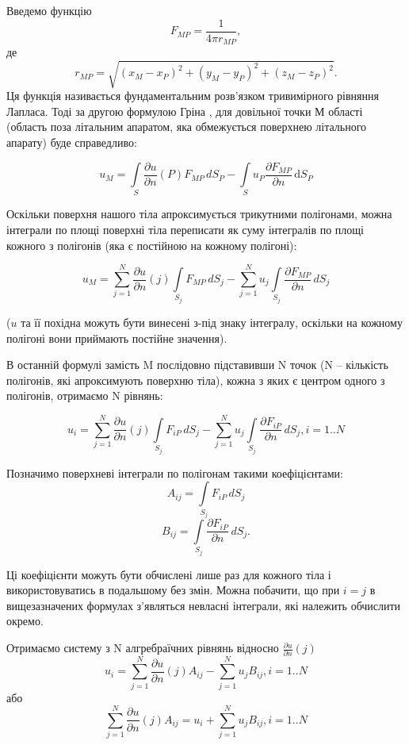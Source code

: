 \documentclass[a4paper,12pt]{article}
\begin{document}
Введемо функцію \[F_{MP} = \frac{1}{4\pi r_{MP}},\] де \[r_{MP} = \sqrt{(x_M - x_P)^2 + (y_M - y_P)^2 + (z_M - z_P)^2}.\]
Ця функція називається фундаментальним розв’язком тривимірного рівняння Лапласа. Тоді за другою формулою Гріна \cite{ilina}, для довільної точки М області (область поза літальним апаратом, яка обмежується поверхнею літального апарату) буде справедливо:

\[
u_M = \int\limits_S \frac{\partial u}{\partial n}(P) F_{MP} \, d S_P - \int\limits_S u_P \frac{\partial F_{MP}}{\partial n} \, \mathrm{d}S_P
\]

Оскільки поверхня нашого тіла апроксимується трикутними полігонами, можна інтеграли по площі поверхні тіла переписати як суму інтегралів по площі кожного з полігонів (яка є постійною на кожному полігоні):

\begin{equation} \label{eq:triangulated_equation}
u_M = \sum_{j=1}^{N} \frac{\partial u}{\partial n}(j) \int\limits_{S_j} F_{MP} \, dS_j - \sum_{j=1}^{N} u_j \int\limits_{S_j} \frac{\partial F_{MP}}{\partial n} \, dS_j
\end{equation}

($u$ та її похідна можуть бути винесені з-під знаку інтегралу, оскільки на кожному полігоні вони приймають постійне значення).

В останній формулі замість M послідовно підставивши N точок (N -- кількість полігонів, які апроксимують поверхню тіла), кожна з яких є центром одного з полігонів, отримаємо N рівнянь:

\[
u_i = \sum_{j=1}^{N} \frac{\partial u}{\partial n}(j) \int\limits_{S_j} F_{iP} \, dS_j - \sum_{j=1}^{N} u_j \int\limits_{S_j} \frac{\partial F_{iP}}{\partial n} \, dS_j, i = 1..N
\]

Позначимо поверхневі інтеграли по полігонам такими коефіцієнтами:
\[A_{ij} = \int\limits_{S_j} F_{iP} \, dS_j\]
\[B_{ij} = \int\limits_{S_j} \frac{\partial F_{iP}}{\partial n} \, dS_j.\]

Ці коефіцієнти можуть бути обчислені лише раз для кожного тіла і використовуватись в подальшому без змін. Можна побачити, що при $i = j$ в вищезазначених формулах з’являться невласні інтеграли, які належить обчислити окремо.

Отримаємо систему з N алгребраїчних рівнянь відносно $\frac{\partial u}{\partial n}(j)$
\[
u_i = \sum_{j=1}^{N} \frac{\partial u}{\partial n}(j) A_{ij} - \sum_{j=1}^{N} u_j B_{ij}, i = 1..N
\]
або
\[
\sum_{j=1}^{N} \frac{\partial u}{\partial n}(j) A_{ij} = u_i + \sum_{j=1}^{N} u_j B_{ij}, i = 1..N
\]
\end{document}
